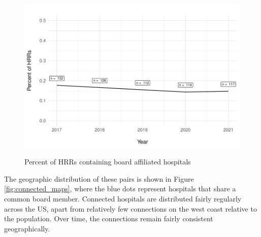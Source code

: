 \documentclass[12pt]{article}
\begin{document}
    \begin{figure}[ht!]
        \centering
        \caption{Percent of HRRs containing board affiliated hospitals}
        \includegraphics[width=.8\textwidth]{Objects/connected_HRR_percent.pdf}
        \label{fig:connected_HRR_percent}
    \end{figure}

    The geographic distribution of these pairs is shown in Figure \ref{fig:connected_maps}, where the blue dots represent hospitals that share a common board member. Connected hospitals are distributed fairly regularly across the US, apart from relatively few connections on the west coast relative to the population. Over time, the connections remain fairly consistent geographically. 
\end{document}
